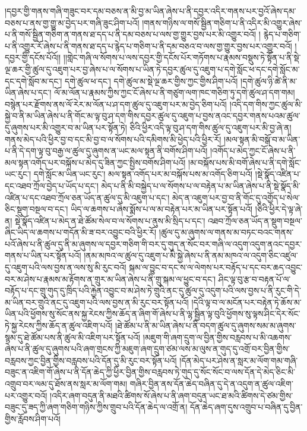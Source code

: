 །དབྱར་གྱི་གནས་གཞི་གཟུང་བར་དམ་བཅས་ན་མི་བྱ་མ་ཡིན་ཞེས་པ་ནི་དབྱར་འདིར་གནས་པར་བྱའོ་ཞེས་དམ་བཅས་པ་ནས་གྱ་གྱུ་མ་བྱེད་པར་གཞི་ཟུང་ཤིག་པའོ། །གནས་གཉིས་ལ་གསོ་སྦྱིན་གཅིག་པ་ནི་འདིར་མི་འགྱུར་ཞེས་པ་ནི་གསོ་སྦྱིན་གཅིག་ན་གནས་ཐ་དད་པ་ནི་དམ་བཅས་པ་ལས་གྱ་གྱུར་བྱས་པར་མི་འགྱུར་བའོ། །
རྙེད་པ་གཅིག་པ་ནི་འགྱུར་རོ་ཞེས་པ་ནི་གནས་ཐ་དད་པ་རྙེད་པ་གཅིག་པ་ནི་དམ་བཅའ་བ་ལས་གྱ་གྱུར་བྱས་པར་འགྱུར་བའོ། །དབྱར་གྱི་དངོས་པོའོ།། །།གླེང་གཞི་ལ་སོགས་པ་ལས་དབྱར་གྱི་དངོས་པོར་གཏོགས་པ་རྣམས་བསྡུས་ཏེ་སྟོན་པ་ནི་སྡེ་ལྔ་ཆར་གྱི་ཚུལ་དུ་འཇུག་པར་བྱ་ཞེས་པ་ལ་སོགས་པ་ཡིན་ཏེ་དབྱར་ཚུལ་དུ་འཇུག་པ་དགེ་སློང་ཕ་དང་དགེ་སློང་མ་དང་དགེ་སློབ་མ་དང་། དགེ་ཚུལ་ཕ་དང་། དགེ་ཚུལ་མ་སྡེ་ལྔ་ཆར་གྱིས་ཀྱང་གྱིས་ཤིག་པའོ། །དགེ་ཚུལ་ཉི་ཚེ་ནི་མ་ཡིན་ཞེས་པ་དང་། ལོ་མ་ལོན་པ་རྣམས་ཀྱིས་ཀྱང་ངོ་ཞེས་པ་ནི་གཙུག་ལག་ཁང་གཅིག་ཏུ་དགེ་ཚུལ་ཤ་དག་གམ། བསྙེན་པར་རྫོགས་ནས་ལོ་རེར་མ་ལོན་པ་ཤ་དག་ཚུལ་དུ་འཇུག་པར་མ་བྱེད་ཅིག་པའོ། །འདི་དག་གིས་ཀྱང་ཚུལ་མི་སྐྱེ་བ་ནི་མ་ཡིན་ཞེས་པ་ནི་གོང་མ་ལྟ་བུ་ཤ་དག་གིས་དབྱར་ཚུལ་དུ་འཇུག་པ་བྱས་ནའང་དབྱར་གནས་པའམ་ཚུལ་དུ་ཞུགས་པར་མི་འགྱུར་བ་མ་ཡིན་པར་སྟོན་ཏེ། ཅིའི་ཕྱིར་འདི་ལྟ་བུ་ཤ་དག་གིས་ཚུལ་དུ་འཇུག་པར་མི་བྱ་ཞེ་ན། གནས་མེད་པའི་ཕྱིར་བྱ་བ་དང་མི་བྱ་བ་ལ་སོགས་པའི་དམིགས་མི་ཕྱེད་པའི་ཕྱིར་རོ། །མལ་སྟན་མི་བསྒོ་བ་མ་ཡིན་པ་ནི་དེ་དག་ལྟ་བུ་བརྒྱ་ལ་ཚུལ་དུ་ཞུགས་ན་ཡང་མལ་སྟན་ནི་བགོས་ཤིག་པའོ། །འགོད་པ་མེད་ཀྱང་ངོ་ཞེས་པ་ནི་མལ་སྟན་འགོད་པར་བསྐོས་པ་མེད་དུ་ཟིན་ཀྱང་སྤྱིས་བགོས་ཤིག་པའོ། །མ་བསྐོས་པས་མི་བགོ་ཞེས་པ་ནི་དགེ་སློང་ཡང་རུང་། དགེ་སློང་མ་ཡིན་ཡང་རུང་། མལ་སྟན་འགོད་པར་མ་བསྐོས་པས་མ་འགོད་ཅིག་པའོ། །སྡེ་སྣོད་འཛིན་པ་དང་འཐབ་ཀྲོལ་བྱེད་པ་ཡོད་པ་དང་། མེད་པ་ནི་མི་བསྐྱེད་པ་ལ་སོགས་པ་ལ་བརྟེན་པ་མ་ཡིན་ཞེས་པ་ནི་སྡེ་སྣོད་མི་འཛིན་པ་དང་འཐབ་ཀྲོལ་ཅན་ཡོད་ན་ཚུལ་དུ་མི་འཇུག་པ་དང་། མེད་ན་འཇུག་པར་བྱ་བ་ནི་གོང་དུ་འགྱོད་པ་སེལ་ཅིང་སྡུག་བསྔལ་བ་དང་། ཡིད་ལ་ཆགས་པ་ཞེས་སྨོས་པ་ལ་མ་བརྟེན་པར་མ་ཡིན་པར་སྟོན་པའོ། །ཅིའི་ཕྱིར་དེ་ལྟ་ཞེ་ན། སྡེ་སྣོད་འཛིན་པ་མེད་ན་ཐེ་ཚོམ་སེལ་བ་ལ་སོགས་པ་ནུས་མི་སྲིད་པ་དང་། འཐབ་ཀྲོལ་ཅན་ཡོད་ན་སྡུག་བསྔལ་ཞིང་ཡིད་ལ་ཆགས་པ་གདོན་མི་ཟ་བར་འབྱུང་བའི་ཕྱིར་རོ། །ཚུལ་དུ་མ་ཞུགས་ལ་གནས་མ་བཏང་བའང་གནས་པའོ་ཞེས་པ་ནི་ཚུལ་དུ་ནི་མ་ཞུགས་ལ་དབྱར་གཅིག་གི་བར་དུ་གུད་ན་སོང་བར་གཞི་ལ་འདུག་འདུག་ནའང་དབྱར་གནས་པ་ཡིན་པར་སྟོན་པའོ། །ནམ་མཁའ་ལ་ཚུལ་དུ་འཇུག་པ་མི་སྐྱེ་ཞེས་པ་ནི་ནམ་མཁའ་ལ་འདུག་ཅིང་འཛུལ་དུ་འཇུག་པའི་ལས་བྱས་ན་ལས་སུ་མི་རུང་བའོ། སྐམ་ལ་བྱུང་བ་དང་ས་ལ་ལེགས་པར་བརྟོད་པ་དང་བར་ཆད་འབྱུང་བར་མ་ཤེས་པ་རྣམས་མ་རྟོགས་ན་གྲུར་མ་ཡིན་ཞེས་པ་ནི་གྲུ་སྐམ་ལ་ཕྱུང་བ་དང་། ཤིང་ལྟ་བུ་རྩ་བ་བརྟན་པོ་ལ་བརྟོད་པ་དང་གྲུ་གུད་དུ་ཁྲིད་པའི་རྐྱེན་འབྱུང་བ་མ་ཤེས་ཏེ་གྲུའི་ནང་དུ་ཚུལ་དུ་འདུག་པའི་ལས་བྱས་པ་ནི་རུང་གི་དེ་མ་ཡིན་བར་གྲུའི་ནང་དུ་འཇུག་པའི་ལས་བྱས་ན་མི་རུང་བར་སྟོན་པའོ། །དེའི་ལྟ་བ་ལ་མངོན་པར་བརྟེན་ཏེ་ཆོས་མ་ཡིན་པའི་ཕྱོགས་སུ་སོང་ནས་སྐྱ་རེངས་ཀྱིས་ཆོད་ན་ཞིག་གོ་ཞེས་པ་ནི་ལྷ་སྦྱིན་ལྟ་བུའི་ཕྱོགས་སུ་ལྟས་ཤིང་དེར་སོང་ཏེ་སྐྱ་རེངས་ཀྱིས་ཆོད་ན་ཚུལ་འཇིག་པའོ། །ཐེ་ཚོམ་པ་ནི་མ་ཡིན་ཞེས་པ་ནི་བདག་ཚུལ་དུ་ཞུགས་སམ་མ་ཞུགས་སྙམ་དུ་ཐེ་ཚོམ་པས་ནི་ཚུལ་མི་འཇིག་པར་སྟོན་པའོ། །མཇུག་གི་ཞག་དྲུག་ལ་བྱིན་གྱིས་བརླབས་པ་མི་འཆགས་ཞེས་པ་ནི་ཚུལ་དུ་ཞུགས་པའི་ཞག་གྲངས་ཀྱི་མཇུག་ཞག་དྲུག་ཙམ་ལས་མ་ལུས་ན་གུད་དུ་འགྲོ་བར་བྱིན་གྱིས་བརླབས་ཀྱང་བྱིན་གྱིས་བརླབས་པའི་དོན་དུ་མི་རུང་བར་སྟོན་པའོ། །དོན་མེད་པར་ཤེས་ན་སླར་མ་ལོག་གམ་གཞི་བཟུང་ན་འཇིག་གོ་ཞེས་པ་ནི་དོན་ཆེད་ཀྱི་ཕྱིར་བྱིན་གྱིས་བརླབས་ཏེ་གུད་དུ་སོང་སོང་བ་ལས་དོན་དེ་མེད་ཅིང་མི་འགྲུབ་བར་ལམ་དུ་ཐོས་ནས་སླར་མ་ལོག་གམ། གཞིར་བྱིན་ནས་དོན་ཆེད་བཞིན་དུ་དེ་ན་འདུག་ན་ཚུལ་འཇིག་པར་འགྱུར་བའོ། །འདིར་ཞག་བདུན་ནི་མཐའི་ཚིགས་སོ་ཞེས་པ་ནི་ཞག་བདུན་ཡང་ཐ་མའི་ཚིགས་དེ་ཙམ་གྱིས་བཟུང་དུ་ཟད་ཀྱི་ཞག་གཅིག་གཉིས་ཀྱིས་གྲུབ་པའི་དོན་ཆེད་ལ་འགྲོ་ན། དོན་ཆེད་ཞག་དུས་འགྲུབ་པ་བཞིན་དུ་བྱིན་གྱིས་རློབས་ཤིག་པའོ། 